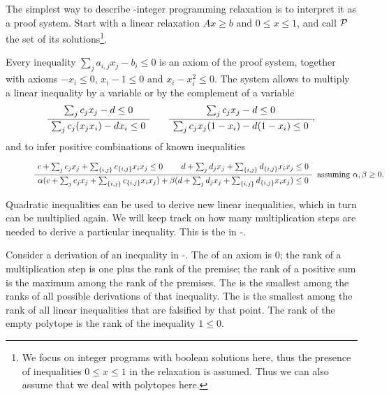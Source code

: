 \documentclass[a4paper,twoside,justified]{tufte-handout}
\begin{document}
The simplest way to describe \Lovasz-\Schrijver integer programming
relaxation is to interpret it as a proof system. Start with a linear
relaxation $ Ax \geq b$ and $ 0 \leq x \leq 1$, and call $ \mathcal{P} $ the set
of its solutions\footnote{We focus on integer programs with boolean
  solutions here, thus the presence of inequalities $ 0 \leq x \leq 1
  $ in the relaxation is assumed. Thus we can also assume that we deal
  with polytopes here.}.

Every inequality $ \sum_{j}a_{i,j}x_{j} - b_{i} \leq 0$ is an axiom of
the proof system, together with axioms $ - x_{i} \leq 0$, $ x_{i} - 1
\leq 0$ and $ x_{i} - x^{2}_{i} \leq 0$.  The system allows to multiply a
linear inequality by a variable or by the complement of a variable
\begin{equation}\label{eq:lsmultiplication}
\AxiomC{$\sum_{j}c_{j} x_{j} - d \leq 0$}
\UnaryInfC{$ \sum_{j}c_{j}(x_{j}x_{i}) - d x_{i} \leq 0$}
\DisplayProof
\qquad
\AxiomC{$ \sum_{j}c_{j} x_{j} - d \leq 0$}
\UnaryInfC{$ \sum_{j}c_{j}x_{j}(1-x_{i}) - d (1-x_{i}) \leq 0$}
\DisplayProof,
\end{equation}
%
and to infer positive combinations of known inequalities

\begin{figure*}
\begin{equation}
\RightLabel{\ assuming $\alpha, \beta \geq 0$.}
\AxiomC{$c+\sum_{j}c_{j} x_{j} + \sum_{\{i,j\}} c_{\{i,j\}}x_{i}x_{j}\leq 0$}
\AxiomC{$d+\sum_{j}d_{j} x_{j} + \sum_{\{i,j\}} d_{\{i,j\}}x_{i}x_{j}\leq 0$}
\BinaryInfC{%
$\alpha (c+\sum_{j}c_{j} x_{j} + \sum_{\{i,j\}} c_{\{i,j\}}x_{i}x_{j})+
\beta (d+\sum_{j}d_{j} x_{j} + \sum_{\{i,j\}} d_{\{i,j\}}x_{i}x_{j}) \leq 0$}
\DisplayProof
\end{equation}
\end{figure*}

Quadratic inequalities can be used to derive new linear inequalities,
which in turn can be multiplied again. We will keep track on how many
multiplication steps are needed to derive a particular
inequality. This is the  in
\Lovasz-\Schrijver.

\begin{definition}
  Consider a derivation of an inequality in \Lovasz-\Schrijver. The
   of an axiom is $ 0 $; the
  rank of a multiplication step is one plus the rank of the premise;
  the rank of a positive sum is the maximum among the rank of the
  premises.  The  is the smallest
  among the ranks of all possible derivations of that inequality. The
   is the smallest among the rank of
  all linear inequalities that are falsified by that point. The rank
  of the empty polytope is the rank of the inequality $ 1 \leq 0 $.
\end{definition}
\end{document}

